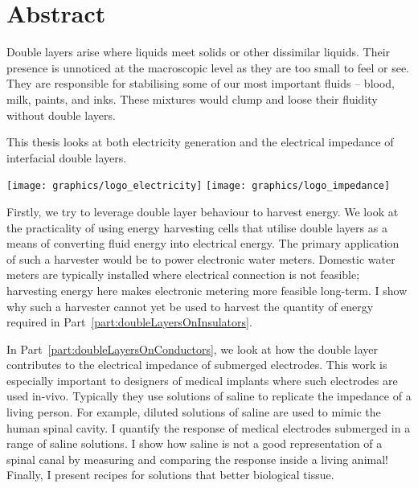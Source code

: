 





\rmfamily


\chapter*{Abstract}
  Double layers arise where liquids meet solids or other dissimilar liquids.
  Their presence is unnoticed at the macroscopic level as they are too small to feel or see.
  They are responsible for stabilising some of our most important fluids -- blood, milk, paints, and inks.
  These mixtures would clump and loose their fluidity without double layers.

  \vspace{-0.3cm}
  \begin{center}
    \parbox{8.8cm}{
      \begin{center}
        This thesis looks at both electricity generation and the electrical impedance of interfacial double layers.
      \end{center}
      \vspace{-1.35cm}
    }
    \vspace{-0.3cm}
    \parbox{15cm}{
        \hspace{0.8cm}
        \hbox{\vspace{-0.9cm}\texttt{[image: graphics/logo\_electricity]}}
        \hbox{\hspace{9.8cm}\texttt{[image: graphics/logo\_impedance]}}
    }
  \end{center}
  \vspace{0.5cm}

  Firstly, we try to leverage double layer behaviour to harvest energy.
  We look at the practicality of using energy harvesting cells that utilise double layers as a means of converting fluid energy into electrical energy.
  The primary application of such a harvester would be to power electronic water meters.
  Domestic water meters are typically installed where electrical connection is not feasible; harvesting energy here makes electronic metering more feasible long-term.
  I show why such a harvester cannot yet be used to harvest the quantity of energy required in Part~\ref{part:doubleLayersOnInsulators}.

  In Part~\ref{part:doubleLayersOnConductors}, we look at how the double layer contributes to the electrical impedance of submerged electrodes.
  This work is especially important to designers of medical implants where such electrodes are used in-vivo.
  Typically they use solutions of saline to replicate the impedance of a living person.
  For example, diluted solutions of saline are used to mimic the human spinal cavity.
  I quantify the response of medical electrodes submerged in a range of saline solutions.
  I show how saline is not a good representation of a spinal canal by measuring and comparing the response inside a living animal!
  Finally, I present recipes for solutions that better biological tissue.

